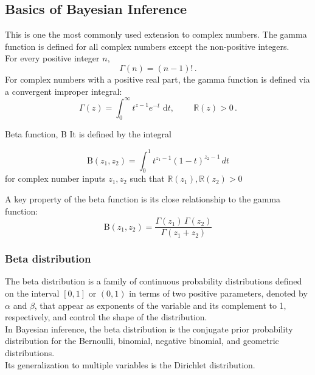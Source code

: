 			\subsection{Basics of Bayesian Inference}
				\begin{defn}
					This is one the most commonly used extension to complex numbers. The gamma function is defined for all complex numbers except the non-positive integers.\\
					For every positive integer $n$,
					\begin{equation}\label{eqn:gamma_int}
						\Gamma (n)=(n-1)!\,.
					\end{equation}
					For complex numbers with a positive real part, the gamma function is defined via a convergent improper integral:
						\begin{equation}\label{eqn:gamma_complex}
							\Gamma (z)=\int _{0}^{\infty }t^{z-1}e^{-t}{\text{ d}}t,\ \qquad \mathbb{R} (z)>0\,.
						\end{equation}
				\end{defn}

				\begin{defn}{Beta function, B}
					It is defined by the integral

						\begin{equation} \label{eqn:beta}
							\mathrm {B} (z_{1},z_{2})=\int _{0}^{1}t^{z_{1}-1}(1-t)^{z_{2}-1}\,dt			\end{equation}
					for complex number inputs $z_{1},z_{2}$ such that $\mathbb{R}	 (z_{1}),\mathbb{R}(z_{2})>0$
				\end{defn}
				A key property of the beta function is its close relationship to the gamma function:
				\begin{equation}
					\mathrm {B} (z_{1},z_{2})={\frac {\Gamma (z_{1})\,\Gamma (z_{2})}{\Gamma (z_{1}+z_{2})}}
				\end{equation}
				\subsubsection{Beta distribution}
					The beta distribution is a family of continuous probability distributions defined on the interval $[0, 1]$ or $(0, 1)$ in terms of two positive parameters, denoted by $\alpha$ and $\beta$, that appear as exponents of the variable and its complement to 1, respectively, and control the shape of the distribution.\\
					In Bayesian inference, the beta distribution is the conjugate prior probability distribution for the Bernoulli, binomial, negative binomial, and geometric distributions.\\
					Its generalization to multiple variables is the Dirichlet distribution.\\

